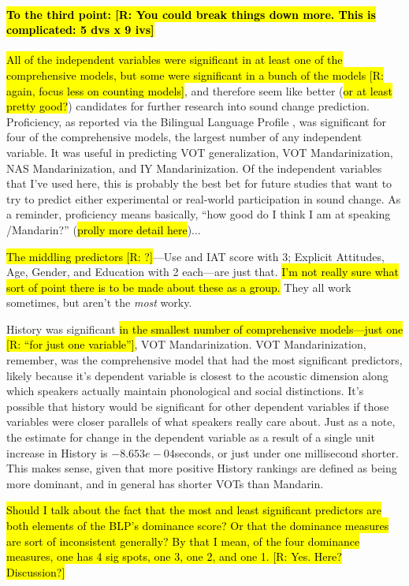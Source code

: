 \paragraph{\hl{To the third point: [R: You could break things down more. This is complicated: 5 dvs x 9 ivs]}}
\hl{All of the independent variables were significant in at least one of the comprehensive models, but some were significant in a bunch of the models [R: again, focus less on counting models]}, and therefore seem like better (\hl{or at least pretty good?}) candidates for further research into sound change prediction. Proficiency, as reported via the Bilingual Language Profile \citep{birdsong2012bilingual, gertken2014assessing}, was significant for four of the comprehensive models, the largest number of any independent variable. It was useful in predicting VOT generalization, VOT Mandarinization, NAS Mandarinization, and IY Mandarinization. Of the independent variables that I've used here, this is probably the best bet for future studies that want to try to predict either experimental or real-world participation in sound change. As a reminder, proficiency means basically, ``how good do I think I am at speaking \ND{}/Mandarin?'' (\hl{prolly more detail here})...

\hl{The middling predictors [R: ?]}---Use and IAT score with 3; Explicit Attitudes, Age, Gender, and Education with 2 each---are just that. \hl{I'm not really sure what sort of point there is to be made about these as a group.} They all work sometimes, but aren't the \emph{most} worky.

History was significant \hl{in the smallest number of comprehensive models---just one [R: ``for just one variable'']}, VOT Mandarinization. VOT Mandarinization, remember, was the comprehensive model that had the most significant predictors, likely because it's dependent variable is closest to the acoustic dimension along which speakers actually maintain phonological and social distinctions. It's possible that history would be significant for other dependent variables if those variables were closer parallels of what speakers really care about. Just as a note, the estimate for change in the dependent variable as a result of a single unit increase in History is $-8.653e-04$seconds, or just under one millisecond shorter. This makes sense, given that more positive History rankings are defined as being more \ND{} dominant, and \ND{} in general has shorter VOTs than Mandarin.

\hl{Should I talk about the fact that the most and least significant predictors are both elements of the BLP's dominance score? Or that the dominance measures are sort of inconsistent generally? By that I mean, of the four dominance measures, one has 4 sig spots, one 3, one 2, and one 1. [R: Yes. Here? Discussion?]}


